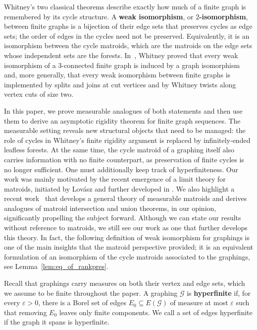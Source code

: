 \documentclass{article}
\theoremstyle{plain}
\theoremstyle{definition}
\newcommand{\cG}{\mathcal{G}}
\newcommand{\eps}{\varepsilon}
\begin{document}
Whitney's two classical theorems describe exactly how much of a finite graph is remembered by its cycle structure. A \textbf{weak isomorphism}, or \textbf{$2$-isomorphism}, between finite graphs is a bijection of their edge sets that preserves cycles as edge sets; the order of edges in the cycles need not be preserved. Equivalently, it is an isomorphism between the cycle matroids, which are the matroids on the edge sets whose independent sets are the forests. In~\cite{whitney19332}, Whitney proved that every weak isomorphism of a $3$-connected finite graph is induced by a graph isomorphism and, more generally, that every weak isomorphism between finite graphs is implemented by splits and joins at cut vertices and by Whitney twists along vertex cuts of size two. 

In this paper, we prove measurable analogues of both statements and then use them to derive an asymptotic rigidity theorem for finite graph sequences. The measurable setting reveals new structural objects that need to be managed: the role of cycles in Whitney's finite rigidity argument is replaced by infinitely-ended leafless forests. At the same time, the cycle matroid of a graphing itself also carries information with no finite counterpart, as preservation of finite cycles is no longer sufficient. One must additionally keep track of hyperfiniteness. Our work was mainly motivated by the recent emergence of a limit theory for matroids, initiated by Lovász \cite{lovasz2023submodular, lovasz2024matroid} and further developed in \cite{berczi2026cycle,berczi2024quotient,berczi2025convergent}.
We also highlight a recent work~\cite{Measurable_Matroids} that develops a general theory of measurable matroids and derives analogues of matroid intersection and union theorems, in our opinion, significantly propelling the subject forward. Although we can state our results without reference to matroids, we still see our work as one that further develops this theory. In fact, the following definition of weak isomorphism for graphings is one of the main insights that the matroid perspective provided; it is an equivalent formulation of an isomorphism of the cycle matroids associated to the graphings, see Lemma~\ref{lem:eq_of_rankpres}. 

Recall that graphings carry measures on both their vertex and edge sets, which we assume to be finite throughout the paper. A graphing $\cG$ is \textbf{hyperfinite} if, for every $\eps>0$, there is a Borel set of edges $E_0\subseteq E(\cG)$ of measure at most $\eps$ such that removing $E_0$ leaves only finite components. We call a set of edges hyperfinite if the graph it spans is hyperfinite.
\end{document}
